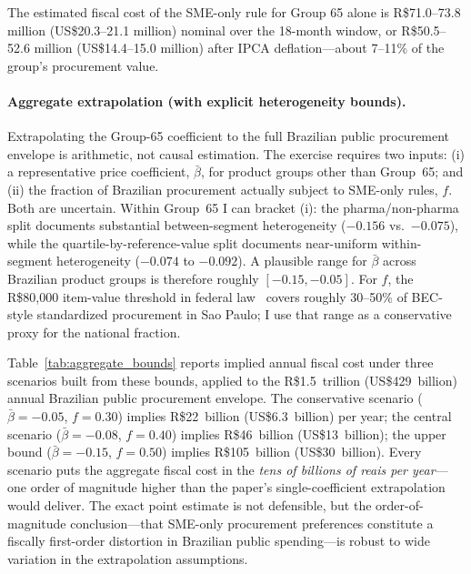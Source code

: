 The estimated fiscal cost of the SME-only rule for Group 65 alone is R\$71.0--73.8 million (US\$20.3--21.1 million) nominal over the 18-month window, or R\$50.5--52.6 million (US\$14.4--15.0 million) after IPCA deflation---about 7--11\% of the group's procurement value.

\paragraph{Aggregate extrapolation (with explicit heterogeneity bounds).}
Extrapolating the Group-65 coefficient to the full Brazilian public procurement envelope is arithmetic, not causal estimation. The exercise requires two inputs: (i) a representative price coefficient, $\bar\beta$, for product groups other than Group~65; and (ii) the fraction of Brazilian procurement actually subject to SME-only rules, $f$. Both are uncertain. Within Group~65 I can bracket (i): the pharma/non-pharma split documents substantial between-segment heterogeneity ($-0.156$ vs.\ $-0.075$), while the quartile-by-reference-value split documents near-uniform within-segment heterogeneity ($-0.074$ to $-0.092$). A plausible range for $\bar\beta$ across Brazilian product groups is therefore roughly $[-0.15, -0.05]$. For $f$, the R\$80{,}000 item-value threshold in federal law~\citep{bosio2022} covers roughly 30--50\% of BEC-style standardized procurement in Sao Paulo; I use that range as a conservative proxy for the national fraction.

Table~\ref{tab:aggregate_bounds} reports implied annual fiscal cost under three scenarios built from these bounds, applied to the R\$1.5~trillion (US\$429~billion) annual Brazilian public procurement envelope. The conservative scenario ($\bar\beta = -0.05$, $f = 0.30$) implies R\$22~billion (US\$6.3~billion) per year; the central scenario ($\bar\beta = -0.08$, $f = 0.40$) implies R\$46~billion (US\$13~billion); the upper bound ($\bar\beta = -0.15$, $f = 0.50$) implies R\$105~billion (US\$30~billion). Every scenario puts the aggregate fiscal cost in the \emph{tens of billions of reais per year}---one order of magnitude higher than the paper's single-coefficient extrapolation would deliver. The exact point estimate is not defensible, but the order-of-magnitude conclusion---that SME-only procurement preferences constitute a fiscally first-order distortion in Brazilian public spending---is robust to wide variation in the extrapolation assumptions.

